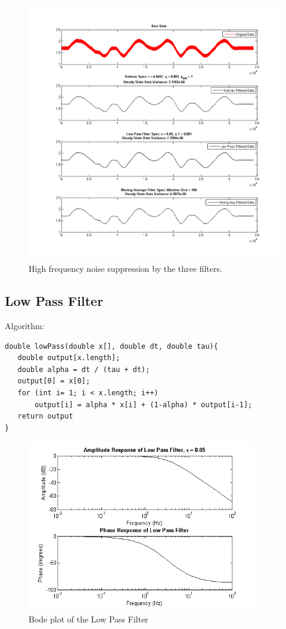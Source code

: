 \documentclass{article}
\theoremstyle{plain}
\theoremstyle{definition}
\theoremstyle{remark}
\begin{document}
\begin{figure}[hbt]
\begin{center}
\includegraphics[width = 16cm]{ss_noise_filtering.png}
\caption{High frequency noise suppression by the three filters.}
\label{ss_noise_filtering}
\end{center}
\end{figure}

\clearpage

\subsection{Low Pass Filter}
Algorithm:
\begin{verbatim}
double lowPass(double x[], double dt, double tau){
   double output[x.length];
   double alpha = dt / (tau + dt);
   output[0] = x[0];
   for (int i= 1; i < x.length; i++)
       output[i] = alpha * x[i] + (1-alpha) * output[i-1];
   return output
}
\end{verbatim}

\begin{figure}[hbt]
\begin{center}
\includegraphics[width = 10cm]{bode_LPF}
\caption{Bode plot of the Low Pass Filter}
\label{bode_LPF}
\end{center}
\end{figure}
\end{document}
